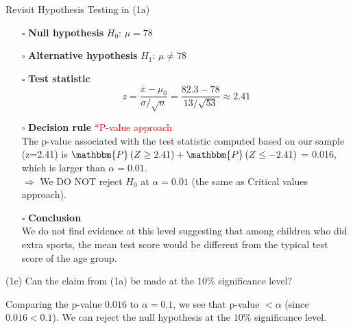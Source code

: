 \documentclass[
  11pt,
  ignorenonframetext,
]{beamer}
\begin{document}
\begin{frame}{Revisit Hypothesis Testing in (1a)}
\protect\hypertarget{revisit-hypothesis-testing-in-1a}{}
\begin{itemize}
    \item [$\square$] \textbf{Null hypothesis} $H_0$: $\mu = 78$\\
    \vspace{2mm}
    \item [$\square$] \textbf{Alternative hypothesis} $H_1$: $\mu \neq 78$\\
    \vspace{2mm}
    \item [$\square$] \textbf{Test statistic}
\small
$$
z = \frac{\bar{x}-\mu_0}{\sigma/\sqrt{n}} = \frac{82.3-78}{13/\sqrt{53}} \approx 2.41
$$
    \normalsize
    \item [$\square$] \textbf{Decision rule} \footnotesize \textcolor{red}{*P-value approach} \small\\
    The p-value associated with the test statistic computed based on our sample (z=2.41) is $\mathbbm{P}\left(Z \geq 2.41 \right) +\mathbbm{P}\left(Z \leq -2.41 \right)$ = 0.016, which is larger than $\alpha = 0.01$.\\
    $\Rightarrow$ We DO NOT reject $H_0$ at $\alpha = 0.01$ (the same as Critical values approach).
    \normalsize
    \item [$\square$] \textbf{Conclusion}\\
    \small
    We do not find evidence at this level suggesting that among children who did extra sports, the mean test score would be different from the typical test score of the age group.
\end{itemize}
\end{frame}

\begin{frame}{(1c) Can the claim from (1a) be made at the \(10\%\)
significance level?}
\protect\hypertarget{c-can-the-claim-from-1a-be-made-at-the-10-significance-level}{}
\pause

Comparing the p-value \(0.016\) to \(\alpha=0.1\), we see that p-value
\(< \alpha\) (since \(0.016 < 0.1\)). We can reject the null hypothesis
at the \(10\%\) significance level.
\end{frame}
\end{document}
